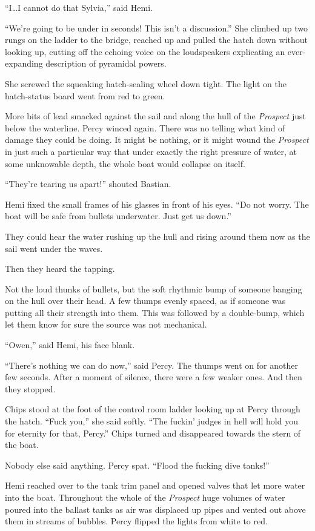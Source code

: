 \documentclass[
]{scrbook}
\begin{document}
``I\ldots I cannot do that Sylvia,'' said Hemi.

``We're going to be under in seconds! This isn't a discussion.'' She
climbed up two rungs on the ladder to the bridge, reached up and pulled
the hatch down without looking up, cutting off the echoing voice on the
loudspeakers explicating an ever-expanding description of pyramidal
powers.

She screwed the squeaking hatch-sealing wheel down tight. The light on
the hatch-status board went from red to green.

More bits of lead smacked against the sail and along the hull of the
\emph{Prospect} just below the waterline. Percy winced again. There was
no telling what kind of damage they could be doing. It might be nothing,
or it might wound the \emph{Prospect} in just such a particular way that
under exactly the right pressure of water, at some unknowable depth, the
whole boat would collapse on itself.

``They're tearing us apart!'' shouted Bastian.

Hemi fixed the small frames of his glasses in front of his eyes. ``Do
not worry. The boat will be safe from bullets underwater. Just get us
down.''

They could hear the water rushing up the hull and rising around them now
as the sail went under the waves.

Then they heard the tapping.

Not the loud thunks of bullets, but the soft rhythmic bump of someone
banging on the hull over their head. A few thumps evenly spaced, as if
someone was putting all their strength into them. This was followed by a
double-bump, which let them know for sure the source was not mechanical.

``Owen,'' said Hemi, his face blank.

``There's nothing we can do now,'' said Percy. The thumps went on for
another few seconds. After a moment of silence, there were a few weaker
ones. And then they stopped.

\bigskip

Chips stood at the foot of the control room ladder looking up at Percy
through the hatch. ``Fuck you,'' she said softly. ``The fuckin' judges
in hell will hold you for eternity for that, Percy.'' Chips turned and
disappeared towards the stern of the boat.

Nobody else said anything. Percy spat. ``Flood the fucking dive tanks!''

Hemi reached over to the tank trim panel and opened valves that let more
water into the boat. Throughout the whole of the \emph{Prospect} huge
volumes of water poured into the ballast tanks as air was displaced up
pipes and vented out above them in streams of bubbles. Percy flipped the
lights from white to red.
\end{document}
